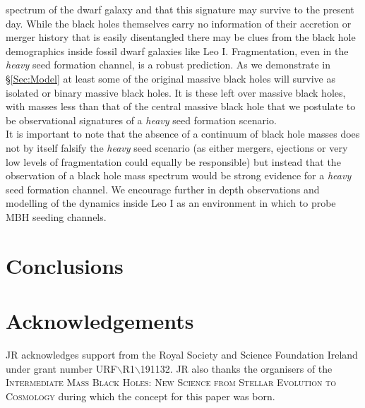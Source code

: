 \documentclass[twocolumn, tighten]{aastex631}
\begin{document}
spectrum of the dwarf galaxy and that this signature may survive to the 
present day. While the black holes themselves carry no information of their accretion or merger history that is easily disentangled there may be clues 
from the black hole demographics inside fossil dwarf galaxies like Leo I. Fragmentation, even in the \textit{heavy} seed formation channel, is a 
robust prediction. As we demonstrate in \S \ref{Sec:Model} at least some of the original 
massive black holes will survive as isolated or binary massive black holes. It is these 
left over massive black holes, with masses less than that of the central massive black hole 
that we postulate to be observational signatures of a \textit{heavy} seed formation scenario. \\
\indent It is important to note that the 
absence of a continuum of black hole masses does not by itself falsify the \textit{heavy} seed scenario (as either mergers, ejections or very low levels of fragmentation could equally be 
responsible) but instead that the observation of a black hole mass spectrum would be strong evidence for a \textit{heavy} seed formation channel. We encourage further in depth observations 
and modelling of the dynamics inside Leo I as an environment in which to probe MBH seeding channels. 


\section{Conclusions} \label{Sec:Conclusions}

\section*{Acknowledgements}

\noindent JR acknowledges support from the Royal Society and Science Foundation Ireland under
grant number URF$\backslash$R1$\backslash$191132. JR also thanks the organisers of the 
\textsc{Intermediate Mass Black Holes: New Science from Stellar Evolution to Cosmology} 
during which the concept for this paper was born.

\label{lastpage}


\end{document}
